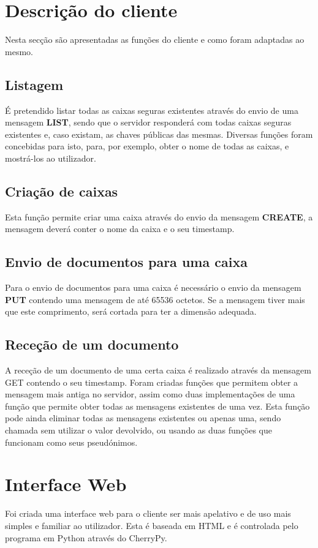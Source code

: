 \documentclass{report}
\begin{document}
\section{Descrição do cliente}
\label{subs.desc}
Nesta secção são apresentadas as funções do cliente e como foram adaptadas ao mesmo.

\subsection{Listagem}
É pretendido listar todas as caixas seguras existentes através do envio de uma mensagem \textbf{LIST}, sendo que o servidor responderá com todas caixas seguras existentes e, caso existam, as chaves públicas das mesmas. Diversas funções foram concebidas para isto, para, por exemplo, obter o nome de todas as caixas, e mostrá-los ao utilizador.


\subsection{Criação de caixas}
Esta função permite criar uma caixa através do envio da mensagem \textbf{CREATE}, a mensagem deverá conter o nome da caixa e o seu timestamp.

\subsection{Envio de documentos para uma caixa}
Para o envio de documentos para uma caixa é necessário o envio da mensagem \textbf{PUT} contendo uma mensagem de até 65536 octetos. Se a mensagem tiver mais que este comprimento, será cortada para ter a dimensão adequada.


\subsection{Receção de um documento}
A receção de um documento de uma certa caixa é realizado através da mensagem GET contendo o seu timestamp. Foram criadas funções que permitem obter a mensagem mais antiga no servidor, assim como duas implementações de uma função que permite obter todas as mensagens existentes de uma vez. Esta função pode ainda eliminar todas as mensagens existentes ou apenas uma, sendo chamada sem utilizar o valor devolvido, ou usando as duas funções que funcionam como seus pseudónimos.

\section{Interface Web}
Foi criada uma interface web para o cliente ser mais apelativo e de uso mais simples e familiar ao utilizador. Esta é baseada em HTML e é controlada pelo programa em Python através do CherryPy.
\end{document}
